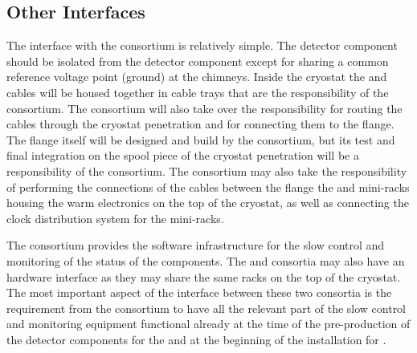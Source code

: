 \subsection{Other Interfaces}
\label{sec:fdsp-tpcelec-interfaces-other}

The interface with the  consortium is relatively simple.
The  detector component should be isolated from the 
detector component except for sharing a common reference 
voltage point (ground) at the chimneys. Inside the cryostat the 
 and  cables will be housed together in
cable trays that are the responsibility of the 
consortium. The  consortium will also take over
the responsibility for routing the  cables through the
cryostat penetration and for connecting them to the 
flange. The flange itself will be designed and build by the 
consortium, but its test and final integration on the spool piece
of the cryostat penetration will be a responsibility of the 
consortium. The  consortium may also
take the responsibility of performing the connections of the 
 cables between the flange the and mini-racks housing
the  warm electronics on the top of the cryostat, as
well as connecting the clock distribution system for the mini-racks.

The  consortium provides the software infrastructure for the slow
control and monitoring of the status of the  components.
The  and  consortia may also have an
hardware interface as they may share the same racks on the top of the
cryostat. The most important aspect of the interface between these
two consortia is the requirement from the  consortium
to have all the relevant part of the slow control and monitoring
equipment functional already at the time of the pre-production of
the detector components for the  and at the beginning
of the installation for \surf. 
